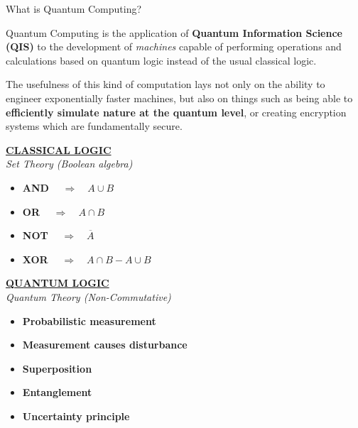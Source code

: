 \documentclass[9pt, handout, aspectratio=169]{beamer}		%
\begin{document}
	\begin{frame}{What is Quantum Computing?}

		\medskip

		Quantum Computing is the application of \textbf{Quantum Information Science (QIS)} to the development of \textit{machines} capable of performing operations and calculations based on quantum logic instead of the usual classical logic.

		\medskip

		The usefulness of this kind of computation lays not only on the ability to engineer exponentially faster machines, but also on things such as being able to \textbf{efficiently simulate nature at the quantum level}, or creating encryption systems which are fundamentally secure.

		\medskip

		\begin{multicols}{2}

			\underline{\textbf{CLASSICAL LOGIC}}\\
			\small{\emph{Set Theory (Boolean algebra)}}

			\medskip

			\begin{itemize}
				\item \textbf{AND} $\quad \Rightarrow \quad A \cup B$
				\item \textbf{OR} $\quad \Rightarrow \quad A \cap B$
				\item \textbf{NOT} $\quad \Rightarrow \quad \overline{A}$
				\item \textbf{XOR} $ \quad \Rightarrow \quad A \cap B - A \cup B$
			\end{itemize}

			\columnbreak

			\underline{\textbf{QUANTUM LOGIC}}\\
			\small{\emph{Quantum Theory (Non-Commutative)}}

			\medskip

			\begin{itemize}
				\item \textbf{Probabilistic measurement}
				\item \textbf{Measurement causes disturbance}
				\item \textbf{Superposition}
				\item \textbf{Entanglement}
				\item \textbf{Uncertainty principle}
			\end{itemize}

		\end{multicols}

	\end{frame}
\end{document}
